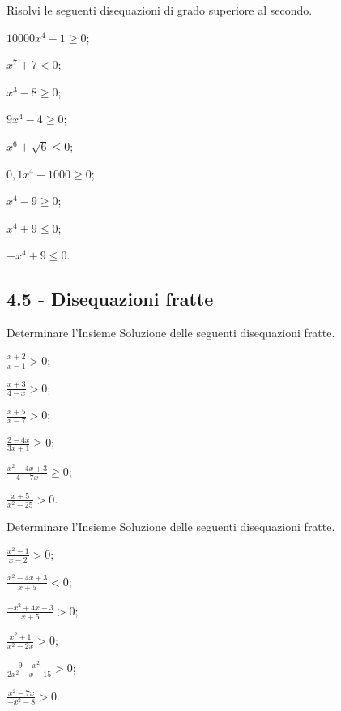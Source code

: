 \begin{esercizio}
 \label{ese:4.57}
Risolvi le seguenti disequazioni di grado superiore al secondo.
\begin{multicols}{3}
\begin{enumeratea}
\item $10000x^4-1\ge 0$;
\item $x^7+7<0$;
\item $x^3-8\ge 0$;
\item $9x^4-4\ge 0$;
\item $x^6+\sqrt 6\le 0$;
\item $0,1x^4-1000\ge 0$;
\item $x^4-9\ge 0$;
\item $x^4+9\le 0$;
\item $-x^4+9\le 0$.
\end{enumeratea}
\end{multicols}
\end{esercizio}

\subsection*{4.5 - Disequazioni fratte}

\begin{esercizio}[\Ast]
 \label{ese:4.58}
Determinare l'Insieme Soluzione delle seguenti disequazioni fratte.
\begin{multicols}{3}
\begin{enumeratea}
\item $\frac{x+2}{x-1}>0$;
\item $\frac{x+3}{4-x}>0$;
\item $\frac{x+5}{x-7}>0$;
\item $\frac{2-4x}{3x+1}\ge 0$;
\item $\frac{x^2-4x+3}{4-7x}\ge 0$;
\item $\frac{x+5}{x^2-25}>0$.
\end{enumeratea}
\end{multicols}
\end{esercizio}

\begin{esercizio}[\Ast]
 \label{ese:4.59}
Determinare l'Insieme Soluzione delle seguenti disequazioni fratte.
\begin{multicols}{3}
\begin{enumeratea}
\item $\frac{x^2-1}{x-2}>0$;
\item $\frac{x^2-4x+3}{x+5}<0$;
\item $\frac{-x^2+4x-3}{x+5}>0$;
\item $\frac{x^2+1}{x^2-2x}>0$;
\item $\frac{9-x^2}{2x^2-x-15}>0$;
\item $\frac{x^2-7x}{-x^2-8}>0$.
\end{enumeratea}
\end{multicols}
\end{esercizio}

